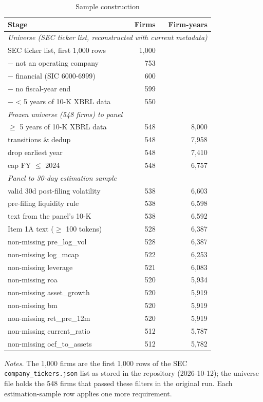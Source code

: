 \begin{table}[htbp]
\centering
\caption{Sample construction}
\label{tab:attrition}
\small
\begin{tabular}{lrr}
\toprule
Stage & Firms & Firm-years \\
\midrule
\multicolumn{3}{l}{\emph{Universe (SEC ticker list, reconstructed with current metadata)}} \\
SEC ticker list, first 1,000 rows & 1,000 &  \\
$-$ not an operating company & 753 &  \\
$-$ financial (SIC 6000-6999) & 600 &  \\
$-$ no fiscal-year end & 599 &  \\
$-$ < 5 years of 10-K XBRL data & 550 &  \\
\multicolumn{3}{l}{\emph{Frozen universe (548 firms) to panel}} \\
$\geq$ 5 years of 10-K XBRL data & 548 & 8,000 \\
transitions \& dedup & 548 & 7,958 \\
drop earliest year & 548 & 7,410 \\
cap FY $\leq$ 2024 & 548 & 6,757 \\
\multicolumn{3}{l}{\emph{Panel to 30-day estimation sample}} \\
valid 30d post-filing volatility & 538 & 6,603 \\
pre-filing liquidity rule & 538 & 6,598 \\
text from the panel's 10-K & 538 & 6,592 \\
Item 1A text ($\geq$ 100 tokens) & 528 & 6,387 \\
non-missing pre\_log\_vol & 528 & 6,387 \\
non-missing log\_mcap & 522 & 6,253 \\
non-missing leverage & 521 & 6,083 \\
non-missing roa & 520 & 5,934 \\
non-missing asset\_growth & 520 & 5,919 \\
non-missing bm & 520 & 5,919 \\
non-missing ret\_pre\_12m & 520 & 5,919 \\
non-missing current\_ratio & 512 & 5,787 \\
non-missing ocf\_to\_assets & 512 & 5,782 \\
\bottomrule
\end{tabular}
\par\smallskip
\begin{minipage}{\linewidth}\footnotesize
\emph{Notes.} The 1{,}000 firms are the first 1{,}000 rows of the SEC \texttt{company\_tickers.json} list as stored in the repository (2026-10-12); the universe file holds the 548 firms that passed these filters in the original run. Each estimation-sample row applies one more requirement.
\end{minipage}
\end{table}
